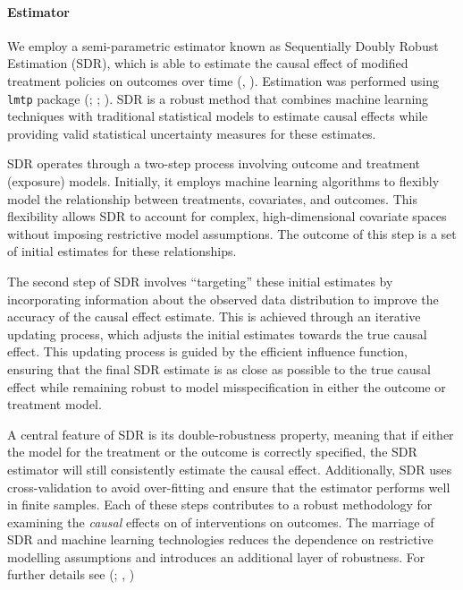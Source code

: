 \documentclass[
  singlecolumn]{article}
\let\oldparagraph\paragraph
\renewcommand{\paragraph}[1]{\oldparagraph{#1}\mbox{}}
\begin{document}
\paragraph{Estimator}\label{estimator}

We employ a semi-parametric estimator known as Sequentially Doubly
Robust Estimation (SDR), which is able to estimate the causal effect of
modified treatment policies on outcomes over time
(,
). Estimation was performed using
\texttt{lmtp} package (; ;
). SDR is a robust
method that combines machine learning techniques with traditional
statistical models to estimate causal effects while providing valid
statistical uncertainty measures for these estimates.

SDR operates through a two-step process involving outcome and treatment
(exposure) models. Initially, it employs machine learning algorithms to
flexibly model the relationship between treatments, covariates, and
outcomes. This flexibility allows SDR to account for complex,
high-dimensional covariate spaces without imposing restrictive model
assumptions. The outcome of this step is a set of initial estimates for
these relationships.

The second step of SDR involves ``targeting'' these initial estimates by
incorporating information about the observed data distribution to
improve the accuracy of the causal effect estimate. This is achieved
through an iterative updating process, which adjusts the initial
estimates towards the true causal effect. This updating process is
guided by the efficient influence function, ensuring that the final SDR
estimate is as close as possible to the true causal effect while
remaining robust to model misspecification in either the outcome or
treatment model.

A central feature of SDR is its double-robustness property, meaning that
if either the model for the treatment or the outcome is correctly
specified, the SDR estimator will still consistently estimate the causal
effect. Additionally, SDR uses cross-validation to avoid over-fitting
and ensure that the estimator performs well in finite samples. Each of
these steps contributes to a robust methodology for examining the
\emph{causal} effects on of interventions on outcomes. The marriage of
SDR and machine learning technologies reduces the dependence on
restrictive modelling assumptions and introduces an additional layer of
robustness. For further details see (; , )
\end{document}
